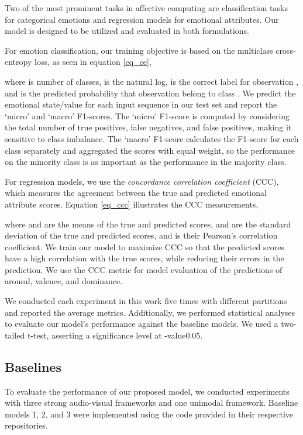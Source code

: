 \documentclass{article}
\begin{document}
Two of the most prominent tasks in affective computing are classification tasks for categorical emotions and regression models for emotional attributes. Our model is designed to be utilized and evaluated in both formulations.

For emotion classification, our training objective is based on the multiclass cross-entropy loss, as seen in equation \ref{eq_ce},

 

\noindent
where  is number of classes,  is the natural log,  is the correct label for observation , and  is the predicted probability that observation  belong to class . We predict the emotional state/value for each input sequence in our test set and report the `micro' and `macro' F1-scores. The `micro' F1-score is computed by considering the total number of true positives, false negatives, and false positives, making it sensitive to class imbalance. The `macro' F1-score calculates the F1-score for each class separately and aggregated the scores with equal weight, so the performance on the minority class is as important as the performance in the majority class. 

For regression models, we use the \emph{concordance correlation coefficient} (CCC), which measures the agreement between the true and predicted emotional attribute scores. Equation \ref{eq_ccc} illustrates the CCC measurements,



\noindent 
where  and  are the means of the true and predicted scores,  and  are the standard deviation of the true and predicted scores, and  is their Pearson's correlation coefficient. We train our model to maximize CCC so that the predicted scores have a high correlation with the true scores, while reducing their errors in the prediction. We use the CCC metric for model evaluation of the predictions of arousal, valence, and dominance.

We conducted each experiment in this work five times with different partitions and reported the average metrics. Additionally, we performed statistical analyses to evaluate our model's performance against the baseline models. We used a two-tailed t-test, asserting a significance level at -value0.05.

\subsection{Baselines}
\label{ssec:baselines}
To evaluate the performance of our proposed model, we conducted experiments with three strong audio-visual frameworks and one unimodal framework. Baseline models 1, 2, and 3 were implemented using the code provided in their respective repositories.
\end{document}
